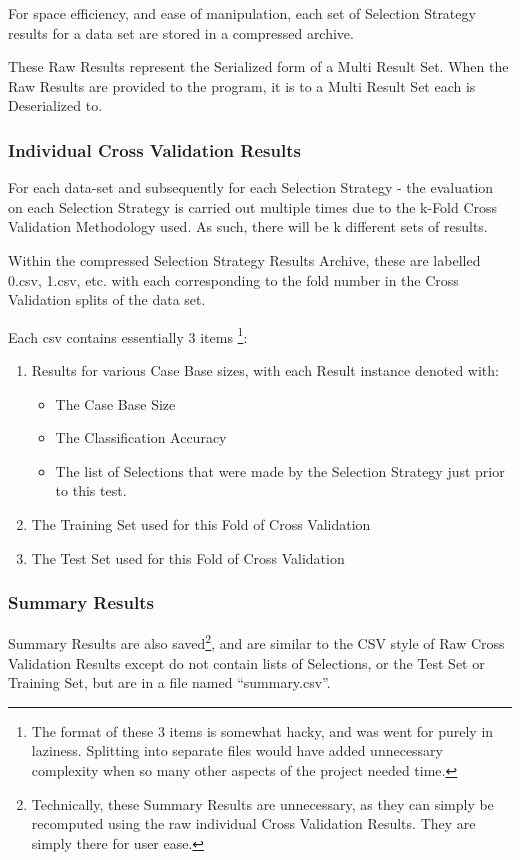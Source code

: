 \documentclass[a4paper,11pt]{report}
\begin{document}
For space efficiency, and ease of manipulation, each set of Selection Strategy results for a data set are stored in a compressed archive.

These Raw Results represent the Serialized form of a Multi Result Set. When the Raw Results are provided to the program, it is to a Multi Result Set each is Deserialized to.

\subsubsection{Individual Cross Validation Results}
For each data-set and subsequently for each Selection Strategy - the evaluation on each Selection Strategy is carried out multiple times due to the k-Fold Cross Validation Methodology used. As such, there will be k different sets of results. 

Within the compressed Selection Strategy Results Archive, these are labelled 0.csv, 1.csv, etc. with each corresponding to the fold number in the Cross Validation splits of the data set.

Each csv contains essentially 3 items \footnote{The format of these 3 items is somewhat hacky, and was went for purely in laziness. Splitting into separate files would have added unnecessary complexity when so many other aspects of the project needed time.}:

\begin{enumerate}
	\item Results for various Case Base sizes, with each Result instance denoted with:
		\begin{itemize}
			\item The Case Base Size
			\item The Classification Accuracy
			\item The list of Selections that were made by the Selection Strategy just prior to this test.
		\end{itemize}
	\item The Training Set used for this Fold of Cross Validation
	\item The Test Set used for this Fold of Cross Validation
\end{enumerate}

\subsubsection{Summary Results}
Summary Results are also saved\footnote{Technically, these Summary Results are unnecessary, as they can simply be recomputed using the raw individual Cross Validation Results. They are simply there for user ease.}, and are similar to the CSV style of Raw Cross Validation Results except do not contain lists of Selections, or the Test Set or Training Set, but are in a file named ``summary.csv''.
\end{document}
